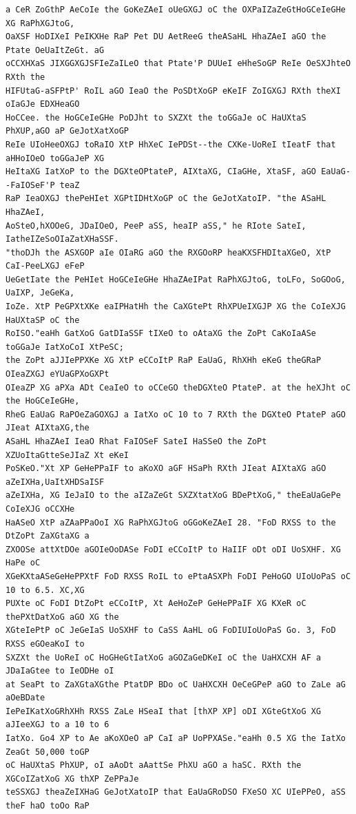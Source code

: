 \documentclass[11pt,a4paper]{article}
\begin{document}
\begin{lstlisting}[style=ciphertext,caption={Complete text after iteration 4}]
a CeR ZoGthP AeCoIe the GoKeZAeI oUeGXGJ oC the OXPaIZaZeGtHoGCeIeGHe XG RaPhXGJtoG,
OaXSF HoDIXeI PeIKXHe RaP Pet DU AetReeG theASaHL HhaZAeI aGO the Ptate OeUaItZeGt. aG
oCCXHXaS JIXGGXGJSFIeZaILeO that Ptate'P DUUeI eHheSoGP ReIe OeSXJhteO RXth the
HIFUtaG-aSFPtP' RoIL aGO IeaO the PoSDtXoGP eKeIF ZoIGXGJ RXth theXI oIaGJe EDXHeaGO
HoCCee. the HoGCeIeGHe PoDJht to SXZXt the toGGaJe oC HaUXtaS PhXUP,aGO aP GeJotXatXoGP
ReIe UIoHeeOXGJ toRaIO XtP HhXeC IePDSt--the CXKe-UoReI tIeatF that aHHoIOeO toGGaJeP XG
HeItaXG IatXoP to the DGXteOPtateP, AIXtaXG, CIaGHe, XtaSF, aGO EaUaG--FaIOSeF'P teaZ
RaP IeaOXGJ thePeHIet XGPtIDHtXoGP oC the GeJotXatoIP. "the ASaHL HhaZAeI,
AoSteO,hXOOeG, JDaIOeO, PeeP aSS, heaIP aSS," he RIote SateI, IatheIZeSoOIaZatXHaSSF.
"thoDJh the ASXGOP aIe OIaRG aGO the RXGOoRP heaKXSFHDItaXGeO, XtP CaI-PeeLXGJ eFeP
UeGetIate the PeHIet HoGCeIeGHe HhaZAeIPat RaPhXGJtoG, toLFo, SoGOoG, UaIXP, JeGeKa,
IoZe. XtP PeGPXtXKe eaIPHatHh the CaXGtePt RhXPUeIXGJP XG the CoIeXJG HaUXtaSP oC the
RoISO."eaHh GatXoG GatDIaSSF tIXeO to oAtaXG the ZoPt CaKoIaASe toGGaJe IatXoCoI XtPeSC;
the ZoPt aJJIePPXKe XG XtP eCCoItP RaP EaUaG, RhXHh eKeG theGRaP OIeaZXGJ eYUaGPXoGXPt
OIeaZP XG aPXa ADt CeaIeO to oCCeGO theDGXteO PtateP. at the heXJht oC the HoGCeIeGHe,
RheG EaUaG RaPOeZaGOXGJ a IatXo oC 10 to 7 RXth the DGXteO PtateP aGO JIeat AIXtaXG,the
ASaHL HhaZAeI IeaO Rhat FaIOSeF SateI HaSSeO the ZoPt XZUoItaGtteSeJIaZ Xt eKeI
PoSKeO."Xt XP GeHePPaIF to aKoXO aGF HSaPh RXth JIeat AIXtaXG aGO aZeIXHa,UaItXHDSaISF
aZeIXHa, XG IeJaIO to the aIZaZeGt SXZXtatXoG BDePtXoG," theEaUaGePe CoIeXJG oCCXHe
HaASeO XtP aZAaPPaOoI XG RaPhXGJtoG oGGoKeZAeI 28. "FoD RXSS to the DtZoPt ZaXGtaXG a
ZXOOSe attXtDOe aGOIeOoDASe FoDI eCCoItP to HaIIF oDt oDI UoSXHF. XG HaPe oC
XGeKXtaASeGeHePPXtF FoD RXSS RoIL to ePtaASXPh FoDI PeHoGO UIoUoPaS oC 10 to 6.5. XC,XG
PUXte oC FoDI DtZoPt eCCoItP, Xt AeHoZeP GeHePPaIF XG KXeR oC thePXtDatXoG aGO XG the
XGteIePtP oC JeGeIaS UoSXHF to CaSS AaHL oG FoDIUIoUoPaS Go. 3, FoD RXSS eGOeaKoI to
SXZXt the UoReI oC HoGHeGtIatXoG aGOZaGeDKeI oC the UaHXCXH AF a JDaIaGtee to IeODHe oI
at SeaPt to ZaXGtaXGthe PtatDP BDo oC UaHXCXH OeCeGPeP aGO to ZaLe aG aOeBDate
IePeIKatXoGRhXHh RXSS ZaLe HSeaI that [thXP XP] oDI XGteGtXoG XG aJIeeXGJ to a 10 to 6
IatXo. Go4 XP to Ae aKoXOeO aP CaI aP UoPPXASe."eaHh 0.5 XG the IatXo ZeaGt 50,000 toGP
oC HaUXtaS PhXUP, oI aAoDt aAattSe PhXU aGO a haSC. RXth the XGCoIZatXoG XG thXP ZePPaJe
teSSXGJ theaZeIXHaG GeJotXatoIP that EaUaGRoDSO FXeSO XC UIePPeO, aSS theF haO toOo RaP

\end{lstlisting}
\end{document}
